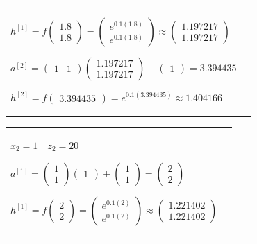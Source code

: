 \documentclass[11pt,a4paper]{article}
\begin{document}
\begin{flushleft}
\begin{tabularx}{1.09\textwidth}{X X}
    $ h^{[1]} = f \begin{pmatrix} 1.8 \\ 1.8 \end{pmatrix} = \begin{pmatrix} e^{0.1(1.8)} \\ e^{0.1(1.8)} \end{pmatrix} \approx \begin{pmatrix} 1.197217 \\ 1.197217 \end{pmatrix} $ \par \vspace{1mm}
    $ a^{[2]} = \begin{pmatrix} 1 & 1 \end{pmatrix} \begin{pmatrix} 1.197217 \\ 1.197217 \end{pmatrix} + \begin{pmatrix} 1 \end{pmatrix} = 3.394435 $ \par \vspace{1mm}
    $ h^{[2]} = f \begin{pmatrix} 3.394435 \end{pmatrix} = e^{0.1(3.394435)} \approx 1.404166 $ \par \vspace{1mm}
  \end{tabularx}
  \begin{tabularx}{1.09\textwidth}{X X}
    $ \boxed{x_2 = 1} \quad z_2 = 20 $ \par \vspace{1mm}
    $ a^{[1]} = \begin{pmatrix} 1 \\ 1 \end{pmatrix} \begin{pmatrix} 1 \end{pmatrix} + \begin{pmatrix} 1 \\ 1 \end{pmatrix} = \begin{pmatrix} 2 \\ 2 \end{pmatrix} $ \par \vspace{1mm}
    $ h^{[1]} = f \begin{pmatrix} 2 \\ 2 \end{pmatrix} = \begin{pmatrix} e^{0.1(2)} \\ e^{0.1(2)} \end{pmatrix} \approx \begin{pmatrix} 1.221402 \\ 1.221402 \end{pmatrix} $ \par \vspace{1mm}

\end{tabularx}
\end{flushleft}
\end{document}
